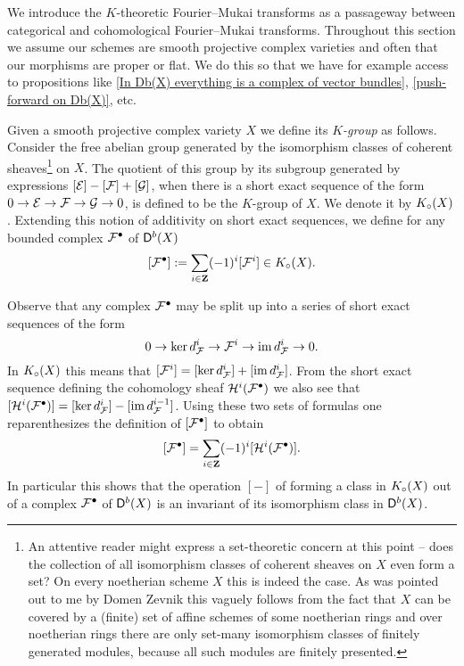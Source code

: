 We introduce the $K$-theoretic Fourier--Mukai transforms as a passageway between categorical and cohomological Fourier--Mukai transforms. Throughout this section we assume our schemes are smooth projective complex varieties and often that our morphisms are proper or flat. We do this so that we have for example access to propositions like \ref{In Db(X) everything is a complex of vector bundles}, \ref{push-forward on Db(X)}, etc.

Given a smooth projective complex variety $X$ we define its \emph{$K$-group} as follows. Consider the free abelian group generated by the isomorphism classes of coherent sheaves\footnote{
    An attentive reader might express a set-theoretic concern at this point -- does the collection of all isomorphism classes of coherent sheaves on $X$ even form a set? On every noetherian scheme $X$ this is indeed the case. As was pointed out to me by Domen Zevnik this vaguely follows from the fact that $X$ can be covered by a (finite) set of affine schemes of some noetherian rings and over noetherian rings there are only set-many isomorphism classes of finitely generated modules, because all such modules are finitely presented. 
} on $X$. The quotient of this group by its subgroup generated by expressions $[\mathcal E] - [\mathcal F] + [\mathcal G]$, when there is a short exact sequence of the form $0 \to \mathcal E \to \mathcal F \to \mathcal G \to 0$, is defined to be the $K$-group of $X$. We denote it by $K_{\circ}(X)$. Extending this notion of additivity on short exact sequences, we define for any bounded complex $\mathcal F^\bullet$ of $\mathsf{D}^b(X)$ 
\[
    [\mathcal F^\bullet] := \sum_{i \in \mathbf Z}(-1)^i[\mathcal F^i] \in K_{\circ}(X).
\]
\begin{remark}
    Observe that any complex $\mathcal F^\bullet$ may be split up into a series of short exact sequences of the form
    \[
        0 \to \ker d^{i}_\mathcal F \to \mathcal F^i \to \operatorname{im} d^i_\mathcal F \to 0.
    \]
    In $K_{\circ}(X)$ this means that $[\mathcal F^i] = [\ker d^{i}_\mathcal F] + [\operatorname{im} d^i_\mathcal F]$. From the short exact sequence defining the cohomology sheaf  $\mathcal H^i(\mathcal F^\bullet)$ we also see that $[\mathcal H^i(\mathcal F^\bullet)] = [\ker d^{i}_\mathcal F] - [\operatorname{im} d^{i-1}_\mathcal F]$. Using these two sets of formulas one reparenthesizes the definition of $[\mathcal F^\bullet]$ to obtain
    \begin{equation}
        \label{eq: K-class alternating sum of cohomology}
        [\mathcal F^\bullet] = \sum_{i \in \mathbf Z}(-1)^i[\mathcal H^i(\mathcal F^\bullet)].
    \end{equation}
    In particular this shows that the operation $[-]$ of forming a class in $K_{\circ}(X)$ out of a complex $\mathcal F^\bullet$ of $\mathsf{D}^b(X)$ is an invariant of its isomorphism class in $\mathsf{D}^b(X)$.
\end{remark}


